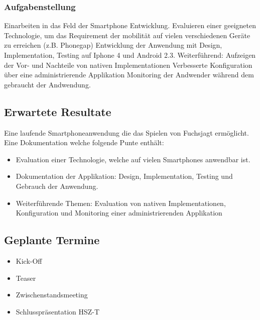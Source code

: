 \subsubsection{Aufgabenstellung} %
\label{ssub:Aufgabenstellung}
Einarbeiten in das Feld der Smartphone Entwicklung.
Evaluieren einer geeigneten Technologie, um das Requirement der mobilität auf vielen verschiedenen Geräte zu erreichen (z.B. Phonegap)
Entwicklung der Anwendung mit Design, Implementation, Testing auf Iphone 4 und Android 2.3.
Weiterführend:
Aufzeigen der Vor- und Nachteile von nativen Implementationen
Verbesserte Konfiguration über eine administrierende Applikation
Monitoring der Andwender während dem gebraucht der Andwendung.

\subsection{Erwartete Resultate} %
\label{sub:Erwartete Resultate}
Eine laufende Smartphoneanwendung die das Spielen von Fuchsjagt ermöglicht.
Eine Dokumentation welche folgende Punte enthält:
\begin{itemize}
    \item Evaluation einer Technologie, welche auf vielen Smartphones anwendbar ist.
    \item Dokumentation der Applikation: Design, Implementation, Testing und Gebrauch der Anwendung.
    \item Weiterführende Themen: Evaluation von nativen Implementationen, Konfiguration und Monitoring einer administrierenden Applikation
\end{itemize}


\subsection{Geplante Termine} %
\label{sub:Geplante Termine}
\begin{itemize}
    \item Kick-Off
    \item Teaser
    \item Zwischenstandsmeeting
    \item Schlusspräsentation HSZ-T
\end{itemize}

